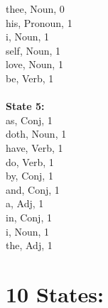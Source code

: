 \begin{multicols}{4}
thee, Noun, 0\\
his, Pronoun, 1\\
i, Noun, 1\\
self, Noun, 1\\
love, Noun, 1\\
be, Verb, 1\\
\\
\noindent\textbf{State 5:} \\
as, Conj, 1\\
doth, Noun, 1\\
have, Verb, 1\\
do, Verb, 1\\
by, Conj, 1\\
and, Conj, 1\\
a, Adj, 1\\
in, Conj, 1\\
i, Noun, 1\\
the, Adj, 1

\section{\textbf{10 States:}}


\end{multicols}
